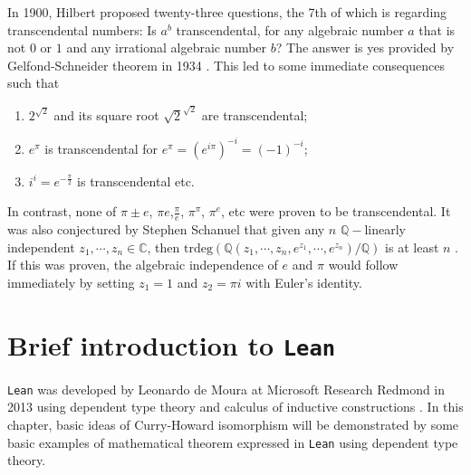 \documentclass{report}
\theoremstyle{definition}
\begin{document}
In 1900, Hilbert proposed twenty-three questions, the 7th of which is regarding transcendental numbers: Is $a^b$ transcendental, for any algebraic number $a$ that is not $0$ or $1$ and any irrational algebraic number $b$? The answer is yes provided by Gelfond-Schneider theorem in 1934 \cite{gelfond1934septieme}. This led to some immediate consequences such that
\begin{enumerate}
  \item $2^{\sqrt2}$ and its square root ${\sqrt2}^{\sqrt2}$ are transcendental;
  \item $e^{\pi}$ is transcendental for $e^{\pi}=\left(e^{i\pi}\right)^{-i}=\left(-1\right)^{-i}$;
  \item $i^i=e^{-\frac\pi2}$ is transcendental etc.
\end{enumerate}
In contrast, none of $\pi\pm e$, $\pi e$,$\frac\pi e$, $\pi^\pi$, $\pi^e$, etc were proven to be transcendental. It was also conjectured by Stephen Schanuel that given any $n$ $\mathbb Q-$linearly independent $z_1,\cdots, z_n\in\mathbb C$, then $\mathrm{trdeg}\left(\mathbb Q(z_1,\cdots, z_n, e^{z_1},\cdots, e^{z_n})/\mathbb Q\right)$ is at least $n$ \cite{lang1966introduction}. If this was proven, the algebraic independence of $e$ and $\pi$ would follow immediately by setting $z_1=1$ and $z_2=\pi i$ with Euler's identity.

\chapter{Brief introduction to {\tt Lean}}\label{intro:lean}

{\tt \small Lean} was developed by Leonardo de Moura at Microsoft Research Redmond in 2013 using dependent type theory and calculus of inductive constructions \cite{avigad2015theorem}. In this chapter, basic ideas of Curry-Howard isomorphism will be demonstrated by some basic examples of mathematical theorem expressed in {\tt \small Lean} using dependent type theory.
\end{document}
